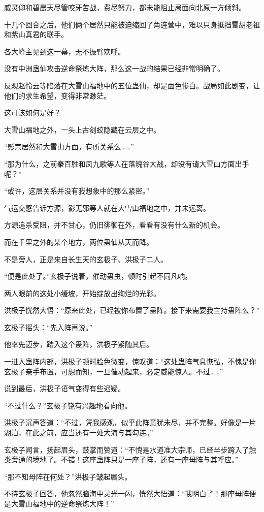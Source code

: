 \begin{this_body}
威灵仰和碧晨天尽管咬牙苦战，费尽努力，都未能阻止局面向北原一方倾斜。

十几个回合之后，他们俩个居然只能被迫缩回了角连营中，难以只身抵挡雪胡老祖和紫山真君的联手。

各大峰主见到这一幕，无不振臂欢呼。

没有中洲蛊仙攻击逆命祭炼大阵，那么这一战的结果已经非常明确了。

反观赵怜云等陷落在大雪山福地中的五位蛊仙，却是面色惨白。战局如此剧变，让他们的求生希望，变得非常渺茫。

这可该如何是好？

大雪山福地之外，一头上古剑蛟隐藏在云层之中。

“影宗居然和大雪山方面，有所关系么……”

“那为什么，之前秦百胜和凤九歌等人在落魄谷大战，却没有请大雪山方面出手呢？”

“或许，这层关系并没有我想象中的那么紧密。”

气运交感告诉方源，影无邪等人就在大雪山福地之中，并未远离。

方源追杀受阻，并不甘心，仍旧徘徊在外，看看有没有什么新的机会。

而在千里之外的某个地方，两位蛊仙从天而降。

不是旁人，正是来自长生天的玄极子、洪极子二人。

“便是此处了。”玄极子说着，催动蛊虫，顿时引起不同凡响。

两人眼前的这处小缓坡，开始绽放出绚烂的光彩。

洪极子恍然大悟：“原来此处，已经被你布置了蛊阵。接下来需要我主持蛊阵么？”

玄极子摇头：“先入阵再说。”

他率先迈步，踏入这个蛊阵，洪极子紧随其后。

一进入蛊阵内部，洪极子顿时脸色微变，惊叹道：“这处蛊阵气息恢弘，不愧是你玄极子亲手布置，可想而知，一旦催动起来，必定威能惊人。不过……”

说到最后，洪极子语气变得有些迟疑。

“不过什么？”玄极子饶有兴趣地看向他。

洪极子沉声答道：“不过，凭我感观，似乎此阵意犹未尽，并不完整。好像是一片湖泊，在此之前，应当还有一处大海与其勾连。”

玄极子闻言，扬起眉头，鼓掌而赞道：“不愧是水道准大宗师，已经半步跨入了触类旁通的境地了。不错！这座蛊阵只是一座子阵，还有一座母阵与其呼应。”

“那不知母阵在何处？”洪极子皱起眉头。

不待玄极子回答，他忽然脑海中灵光一闪，恍然大悟道：“我明白了！那座母阵便是大雪山福地中的逆命祭炼大阵！”


\end{this_body}
